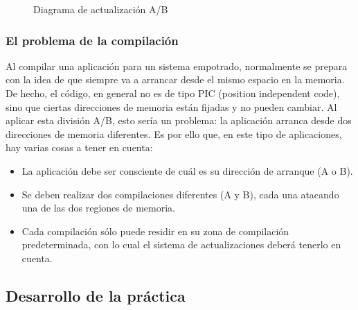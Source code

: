\documentclass[../main.tex]{subfiles}
\begin{document}
\begin{figure}
            \caption{Diagrama de actualización A/B}
            \label{fig:a_b_update}
        \end{figure}

        \subsubsection{El problema de la compilación}
            
            Al compilar una aplicación para un sistema empotrado, normalmente se prepara con la idea de que siempre va a arrancar desde el mismo espacio en la memoria. De hecho, el código, en general no es de tipo PIC (position independent code), sino que ciertas direcciones de memoria están fijadas y no pueden cambiar. Al aplicar esta división A/B, esto sería un problema: la aplicación arranca desde dos direcciones de memoria diferentes. Es por ello que, en este tipo de aplicaciones, hay varias cosas a tener en cuenta:

            \begin{itemize}
                \item La aplicación debe ser consciente de cuál es su dirección de arranque (A o B).
                \item Se deben realizar dos compilaciones diferentes (A y B), cada una atacando una de las dos regiones de memoria. 
                \item Cada compilación sólo puede residir en su zona de compilación predeterminada, con lo cual el sistema de actualizaciones deberá tenerlo en cuenta.
            \end{itemize}

    \subsection{Desarrollo de la práctica}
\end{document}
